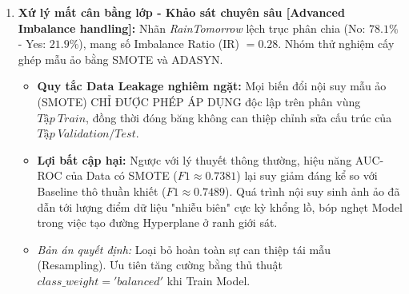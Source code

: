 \documentclass[12pt,a4paper]{article}
\begin{document}
\begin{enumerate}
    \item \textbf{Xứ lý mất cân bằng lớp - Khảo sát chuyên sâu [Advanced Imbalance handling]:}
    Nhãn \textit{RainTomorrow} lệch trục phân chia (No: $78.1\%$ - Yes: $21.9\%$), mang số Imbalance Ratio (IR) $= 0.28$. Nhóm thử nghiệm cấy ghép mẫu ảo bằng SMOTE và ADASYN.
    \begin{itemize}
        \item \textbf{Quy tắc Data Leakage nghiêm ngặt:} Mọi biến đổi nội suy mẫu ảo (SMOTE) CHỈ ĐƯỢC PHÉP ÁP DỤNG độc lập trên phân vùng $Tập \: Train$, đồng thời đóng băng không can thiệp chỉnh sửa cấu trúc của $Tập \: Validation / Test$.
        \item \textbf{Lợi bất cập hại:} Ngược với lý thuyết thông thường, hiệu năng AUC-ROC của Data có SMOTE ($F1 \approx 0.7381$) lại suy giảm đáng kể so với Baseline thô thuần khiết ($F1 \approx 0.7489$). Quá trình nội suy sinh ảnh ảo đã dẫn tới lượng điểm dữ liệu "nhiễu biên" cực kỳ khổng lồ, bóp nghẹt Model trong việc tạo đường Hyperplane ở ranh giới sát. 
        \item \textit{Bản án quyết định:} Loại bỏ hoàn toàn sự can thiệp tái mẫu (Resampling). Ưu tiên tăng cường bằng thủ thuật $class\_weight='balanced'$ khi Train Model.
    \end{itemize}
\end{enumerate}
\end{document}
